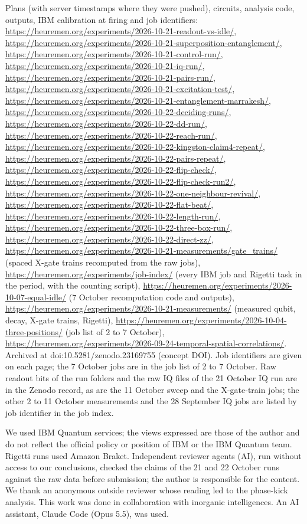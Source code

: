 \documentclass[reprint,amsmath,amssymb,aps,superscriptaddress,nofootinbib]{revtex4-2}
\begin{document}
Plans (with server timestamps where they were pushed), circuits, analysis code, outputs, IBM calibration at firing and job identifiers: \url{https://heuremen.org/experiments/2026-10-21-readout-vs-idle/}, \url{https://heuremen.org/experiments/2026-10-21-superposition-entanglement/}, \url{https://heuremen.org/experiments/2026-10-21-control-run/}, \url{https://heuremen.org/experiments/2026-10-21-iq-run/}, \url{https://heuremen.org/experiments/2026-10-21-pairs-run/}, \url{https://heuremen.org/experiments/2026-10-21-excitation-test/}, \url{https://heuremen.org/experiments/2026-10-21-entanglement-marrakesh/}, \url{https://heuremen.org/experiments/2026-10-22-deciding-runs/}, \url{https://heuremen.org/experiments/2026-10-22-dd-run/}, \url{https://heuremen.org/experiments/2026-10-22-reach-run/}, \url{https://heuremen.org/experiments/2026-10-22-kingston-claim4-repeat/}, \url{https://heuremen.org/experiments/2026-10-22-pairs-repeat/}, \url{https://heuremen.org/experiments/2026-10-22-flip-check/}, \url{https://heuremen.org/experiments/2026-10-22-flip-check-run2/}, \url{https://heuremen.org/experiments/2026-10-22-one-neighbour-revival/}, \url{https://heuremen.org/experiments/2026-10-22-flat-beat/}, \url{https://heuremen.org/experiments/2026-10-22-length-run/}, \url{https://heuremen.org/experiments/2026-10-22-three-box-run/}, \url{https://heuremen.org/experiments/2026-10-22-direct-zz/}, \url{https://heuremen.org/experiments/2026-10-21-measurements/gate_trains/} (spaced X-gate trains recomputed from the raw jobs), \url{https://heuremen.org/experiments/job-index/} (every IBM job and Rigetti task in the period, with the counting script), \url{https://heuremen.org/experiments/2026-10-07-equal-idle/} (7 October recomputation code and outputs), \url{https://heuremen.org/experiments/2026-10-21-measurements/} (measured qubit, decay, X-gate trains, Rigetti), \url{https://heuremen.org/experiments/2026-10-04-three-positions/} (job list of 2 to 7 October), \url{https://heuremen.org/experiments/2026-09-24-temporal-spatial-correlations/}. Archived at doi:10.5281/zenodo.23169755 (concept DOI). Job identifiers are given on each page; the 7 October jobs are in the job list of 2 to 7 October. Raw readout bits of the run folders and the raw IQ files of the 21 October IQ run are in the Zenodo record, as are the 11 October sweep and the X-gate-train jobs; the other 2 to 11 October measurements and the 28 September IQ jobs are listed by job identifier in the job index.

\begin{acknowledgments}
We used IBM Quantum services; the views expressed are those of the author and do not reflect the official policy or position of IBM or the IBM Quantum team. Rigetti runs used Amazon Braket. Independent reviewer agents (AI), run without access to our conclusions, checked the claims of the 21 and 22 October runs against the raw data before submission; the author is responsible for the content. We thank an anonymous outside reviewer whose reading led to the phase-kick analysis. This work was done in collaboration with inorganic intelligences. An AI assistant, Claude Code (Opus 5.5), was used.
\end{acknowledgments}


\end{document}
